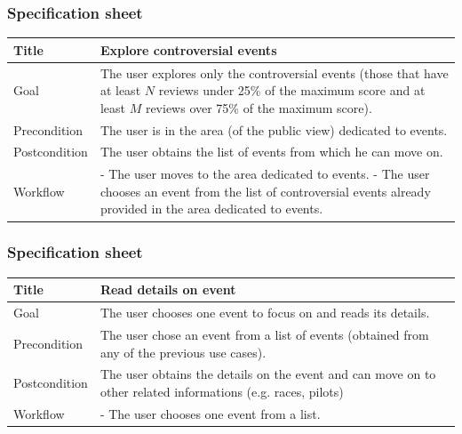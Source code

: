 \documentclass{beamer}
\begin{document}
\begin{frame}
    \frametitle{Specification sheet}
    \begin{table}
        \tiny
        \begin{tabular}{|p{2cm}|p{6cm}|}
        \hline
        Title & \textbf{Explore controversial events} \\
        \hline
        Goal & The user explores only the controversial events (those that have at least $N$ reviews under 25\% of the maximum score
        and at least $M$ reviews over 75\% of the maximum score). \\
        \hline
        Precondition & The user is in the area (of the public view) dedicated to events.\\
        \hline
        Postcondition & The user obtains the list of events from which he can move on.\\
        \hline
        Workflow &
        - The user moves to the area dedicated to events. \newline
        - The user chooses an event from the list of controversial events already provided in the area dedicated to events. \\
        \hline
        \end{tabular}
\end{table}
\end{frame}

\begin{frame}
    \frametitle{Specification sheet}
    \begin{table}
        \tiny
        \begin{tabular}{|p{2cm}|p{6cm}|}
        \hline
        Title & \textbf{Read details on event} \\
        \hline
        Goal & The user chooses one event to focus on and reads its details. \\
        \hline
        Precondition & The user chose an event from a list of events (obtained from any of the previous use cases).\\
        \hline
        Postcondition & The user obtains the details on the event and can move on to other related
        informations (e.g. races, pilots) \\
        \hline
        Workflow &
        - The user chooses one event from a list. \\
        \hline
        \end{tabular}
\end{table}
\end{frame}
\end{document}
